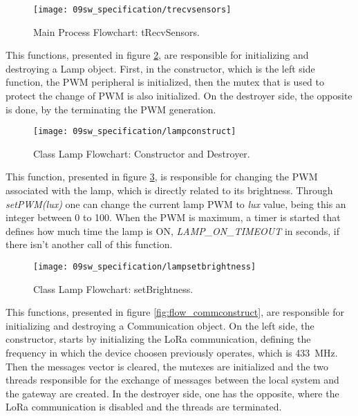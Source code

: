 \begin{figure}[H]
	\centering
	\texttt{[image: 09sw\_specification/trecvsensors]}
	\caption{Main Process Flowchart: tRecvSensors.}
	\label{fig:flow_trecv_sensors}
\end{figure}

\clearpage
{}

This functions, presented in figure \ref{fig:flow_lampconstruct}, are responsible for initializing and destroying a Lamp object. First, in the constructor, which is the left side function, the PWM peripheral is initialized, then the mutex that is used to protect the change of PWM is also initialized. On the destroyer side, the opposite is done, by the terminating the PWM generation.

\begin{figure}[H]
	\centering	
	\texttt{[image: 09sw\_specification/lampconstruct]}
	\caption{Class Lamp Flowchart: Constructor and Destroyer.}
	\label{fig:flow_lampconstruct}
\end{figure}


This function, presented in figure \ref{fig:flow_setbrightness}, is responsible for changing the PWM associated with the lamp, which is directly related to its brightness. Through \textit{setPWM(lux)} one can change the current lamp PWM to \textit{lux} value, being this an integer between 0 to 100. When the PWM is maximum, a timer is started that defines how much time the lamp is ON, \textit{LAMP\_ON\_TIMEOUT} in seconds, if there isn't another call of this function.

\begin{figure}[H]
	\centering	
	\texttt{[image: 09sw\_specification/lampsetbrightness]}
	\caption{Class Lamp Flowchart: setBrightness.}
	\label{fig:flow_setbrightness}
\end{figure}


\clearpage
{}

This functions, presented in figure \ref{fig:flow_commconstruct}, are responsible for initializing and destroying a Communication object. On the left side, the constructor, starts by initializing the LoRa communication, defining the frequency in which the device choosen previously operates, which is 433~MHz. Then the messages vector is cleared, the mutexes are initialized and the two threads responsible for the exchange of messages between the local system and the gateway are created. In the destroyer side, one has the opposite, where the LoRa communication is disabled and the threads are terminated.

